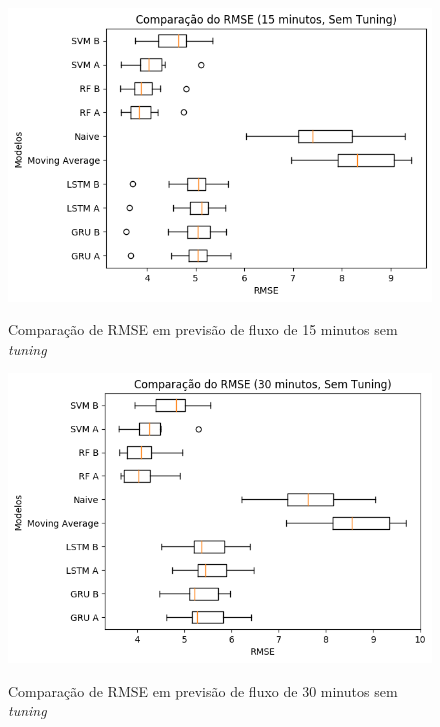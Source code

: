 \label{attachment:snapshots}

\begin{figure}[htbp]
    \centering
    \includegraphics[scale=0.8]{monography/img/snapshots/comparacao_do_rmse_(15_minutos,_sem_tuning)_performance_boxes.png}
    \label{figure:comparacao_previsao_rmse_15_sem_tuning}
    \caption{Comparação de RMSE em previsão de fluxo de 15 minutos sem \textit{tuning}}
\end{figure}

\begin{figure}[htbp]
    \centering
    \includegraphics[scale=0.8]{monography/img/snapshots/comparacao_do_rmse_(30_minutos,_sem_tuning)_performance_boxes.png}
    \label{figure:comparacao_previsao_rmse_30_sem_tuning}
    \caption{Comparação de RMSE em previsão de fluxo de 30 minutos sem \textit{tuning}}
\end{figure}

